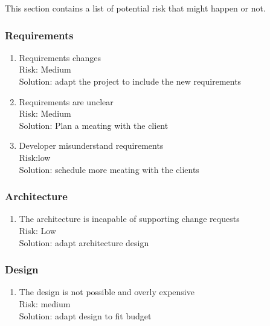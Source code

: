 This section contains a list of potential risk that might happen or not.\\


\subsubsection{Requirements}
\begin{enumerate}
\item Requirements changes\\
Risk: Medium\\
Solution: adapt the project to include the new requirements\\
\item Requirements are unclear\\
Risk: Medium\\
Solution: Plan a meating with the client\\
\item Developer misunderstand requirements \\
Risk:low\\
Solution: schedule more meating with the clients\\
\end{enumerate}

\subsubsection{Architecture} 
\begin{enumerate}
\item The architecture is incapable of supporting change requests\\
Risk: Low\\
Solution: adapt architecture design\\
\end{enumerate}

\subsubsection{Design}
\begin{enumerate}
\item The design is not possible and overly expensive\\
Risk: medium\\
Solution: adapt design to fit budget\\
\end{enumerate}

